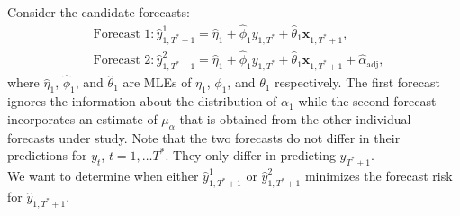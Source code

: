\documentclass[11pt]{article}
\newcommand{\x}{\textbf{x}}
\begin{document}
Consider the candidate forecasts: 
\begin{align*}
  &\text{Forecast 1}: \hat y_{1,T^*+1}^1 = \hat\eta_1 
    + \hat\phi_1 y_{1,T^*} + \hat\theta_1 \x_{1,T^*+1}, \\
  &\text{Forecast 2}: \hat y_{1,T^*+1}^2 = \hat\eta_1 
    + \hat\phi_1 y_{1,T^*} + \hat\theta_1 \x_{1,T^*+1} + \hat{\alpha}_{\text{adj}},
\end{align*}
where $\hat\eta_1$, $\hat\phi_1$, and $\hat\theta_1$ are MLEs of 
$\eta_1$, $\phi_1$, and $\theta_1$ respectively.  
The first forecast ignores the information about the distribution of 
$\alpha_1$ while the second forecast incorporates an estimate of $\mu_\alpha$ 
that is obtained from the other individual forecasts under study.  
Note that the two forecasts do not differ in their predictions for 
$y_{t}$, $t = 1,\ldots T^*$.  They only differ in predicting $y_{T^*+1}$.  \\


We want to determine when either $\hat y_{1,T^*+1}^1$ or $\hat y_{1,T^*+1}^2$ 
minimizes the forecast risk for $\hat y_{1,T^*+1}$.
\end{document}
